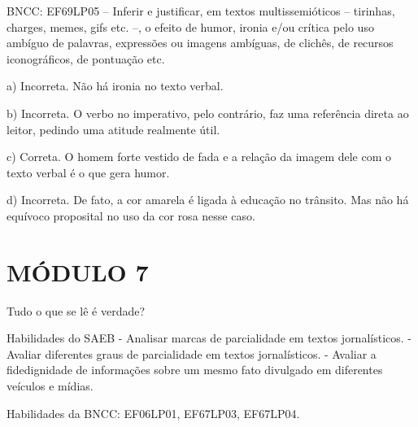 BNCC: EF69LP05 -- Inferir e justificar, em textos multissemióticos --
tirinhas, charges, memes, gifs etc. --, o efeito de humor, ironia e/ou
crítica pelo uso ambíguo de palavras, expressões ou imagens ambíguas, de
clichês, de recursos iconográficos, de pontuação etc.

a) Incorreta. Não há ironia no texto verbal.

b) Incorreta. O verbo no imperativo, pelo contrário, faz uma referência
direta ao leitor, pedindo uma atitude realmente útil.

c) Correta. O homem forte vestido de fada e a relação da imagem dele com
o texto verbal é o que gera humor.

d) Incorreta. De fato, a cor amarela é ligada à educação no trânsito.
Mas não há equívoco proposital no uso da cor rosa nesse caso.


\section{MÓDULO 7}

Tudo o que se lê é verdade?

Habilidades do SAEB - Analisar marcas de parcialidade em textos
jornalísticos. - Avaliar diferentes graus de parcialidade em textos
jornalísticos. - Avaliar a fidedignidade de informações sobre um mesmo
fato divulgado em diferentes veículos e mídias.

Habilidades da BNCC: EF06LP01, EF67LP03, EF67LP04.

